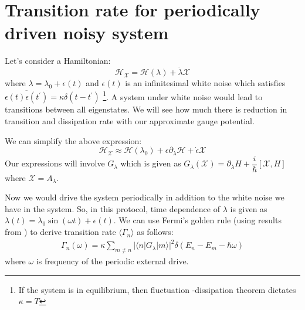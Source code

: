 \documentclass[11pt,a4paper]{article}
\begin{document}
\section{Transition rate for periodically driven noisy system}
Let's consider a Hamiltonian:
\begin{equation}
\mathcal{H}_{\mathcal{X}} = \mathcal{H} (\lambda) + \dot{\lambda} \mathcal{X}
\end{equation}
where $\lambda= \lambda_0 + \epsilon(t)$ and  $\epsilon(t)$  is an infinitesimal white noise which satisfies $\overline{ \epsilon(t) \epsilon(t^{\prime})}= \kappa \delta(t -t^{\prime})$ \footnote{If the system is in equilibrium, then fluctuation -dissipation theorem dictates $\kappa = T$}. 
A system under white noise would lead to transitions between all eigenstates. We will see how much there is reduction in transition and dissipation rate with our approximate gauge potential.

We can simplify the above expression:
\begin{equation}
\mathcal{H}_{\mathcal{X}} \approx \mathcal{H} (\lambda_0)+ \epsilon \partial_{\lambda}\mathcal{H} + \dot{\epsilon} \mathcal{X}
\end{equation}
Our expressions will involve $G_{\lambda}$ which is given as $G_{\lambda}(\mathcal{X} )= \partial_{\lambda} H + \dfrac{i}{\hbar} [\mathcal{X}, H] $ where $\mathcal{X}=A_{\lambda}$.


Now we would drive the system periodically in addition to the white noise we have in the system. So, in this protocol, time dependence of $\lambda$ is given as $\lambda(t)= \lambda_0 \sin (\omega t) + \epsilon(t)$. We can use Fermi's golden rule (using results from \cite{clerk2010introduction}) to derive  transition rate $\langle \Gamma_n \rangle$ \cite{kolodrubetz2016geometry} as follows: 
\begin{align}
 \Gamma_n (\omega) = \kappa  \sum_{m \neq n} |\langle n | G_{\lambda} | m \rangle |^2 \delta(E_n-E_m- \hbar \omega)
\end{align}
where $\omega$ is frequency of the periodic external drive.
\end{document}
